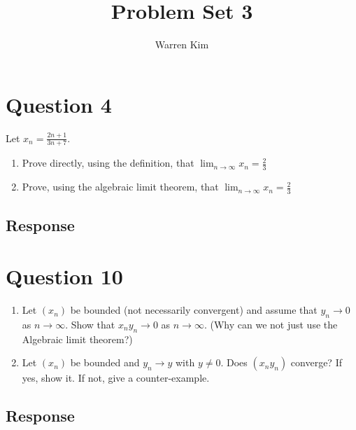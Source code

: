 \documentclass[13pt]{article}
\title{Problem Set 3}
\author{Warren Kim}
\begin{document}
\maketitle

\newpage
\section*{Question 4}
Let $x_n = \frac{2n + 1}{3n + 7}$.
\begin{enumerate}[label=(\alph*)]
\item Prove directly, using the definition, that $\lim_{n \rightarrow
    \infty}x_n = \frac{2}{3}$ 
\item Prove, using the algebraic limit theorem, that $\lim_{n
    \rightarrow \infty}x_n = \frac{2}{3}$ 
\end{enumerate}

\subsection*{Response}





\newpage
\section*{Question 10}
\begin{enumerate}[label=(\alph*)]
\item Let $(x_n)$ be bounded (not necessarily convergent) and assume that
$y_n \rightarrow 0$ as $n \rightarrow \infty$. Show that $x_ny_n
\rightarrow 0 $ as $n \rightarrow \infty$. (Why can we not just use
the Algebraic limit theorem?)
\item Let $(x_n)$ be bounded and $y_n \rightarrow y$ with $y \neq
  0$. Does $(x_ny_n)$ converge? If yes, show it. If not, give a counter-example.
\end{enumerate}

\subsection*{Response}





\newpage
\end{document}
